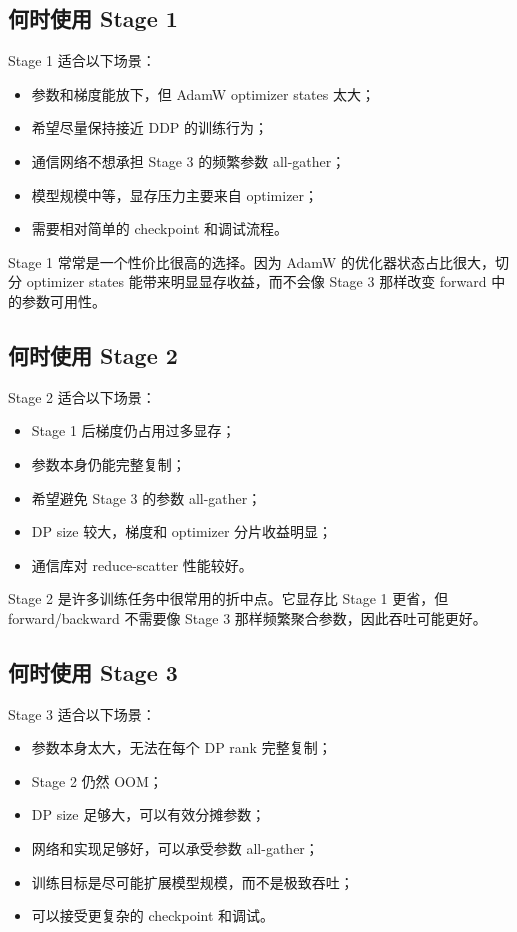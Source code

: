 \subsection{何时使用 Stage 1}
\label{subsec:when-to-use-zero1}

Stage 1 适合以下场景：

\begin{itemize}
\item 参数和梯度能放下，但 AdamW optimizer states 太大；
\item 希望尽量保持接近 DDP 的训练行为；
\item 通信网络不想承担 Stage 3 的频繁参数 all-gather；
\item 模型规模中等，显存压力主要来自 optimizer；
\item 需要相对简单的 checkpoint 和调试流程。
\end{itemize}

Stage 1 常常是一个性价比很高的选择。因为 AdamW 的优化器状态占比很大，切分 optimizer states 能带来明显显存收益，而不会像 Stage 3 那样改变 forward 中的参数可用性。

\subsection{何时使用 Stage 2}
\label{subsec:when-to-use-zero2}

Stage 2 适合以下场景：

\begin{itemize}
\item Stage 1 后梯度仍占用过多显存；
\item 参数本身仍能完整复制；
\item 希望避免 Stage 3 的参数 all-gather；
\item DP size 较大，梯度和 optimizer 分片收益明显；
\item 通信库对 reduce-scatter 性能较好。
\end{itemize}

Stage 2 是许多训练任务中很常用的折中点。它显存比 Stage 1 更省，但 forward/backward 不需要像 Stage 3 那样频繁聚合参数，因此吞吐可能更好。

\subsection{何时使用 Stage 3}
\label{subsec:when-to-use-zero3}

Stage 3 适合以下场景：

\begin{itemize}
\item 参数本身太大，无法在每个 DP rank 完整复制；
\item Stage 2 仍然 OOM；
\item DP size 足够大，可以有效分摊参数；
\item 网络和实现足够好，可以承受参数 all-gather；
\item 训练目标是尽可能扩展模型规模，而不是极致吞吐；
\item 可以接受更复杂的 checkpoint 和调试。
\end{itemize}

